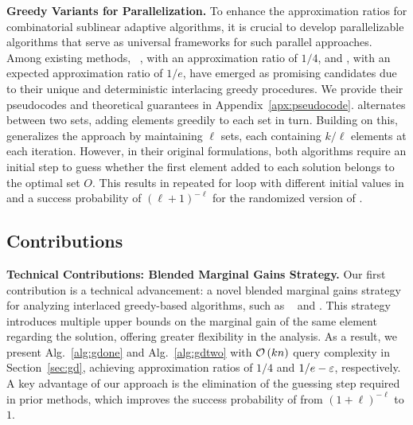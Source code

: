 \textbf{Greedy Variants for Parallelization.}
To enhance the approximation ratios for combinatorial sublinear adaptive algorithms, 
it is crucial to develop parallelizable algorithms that serve as universal frameworks for such parallel approaches. 
Among existing methods, \ig~\citep{DBLP:conf/nips/Kuhnle19}, 
with an approximation ratio of $1/4$, and \itg\citep{DBLP:conf/kdd/ChenK23},
with an expected approximation ratio of $1/e$, 
have emerged as promising candidates 
due to their unique and deterministic interlacing greedy procedures. 
We provide their pseudocodes and theoretical guarantees in Appendix~\ref{apx:pseudocode}. 
\ig alternates between two sets, adding elements greedily to each set in turn. 
Building on this, \itg generalizes the approach by maintaining $\ell$ sets, 
each containing $k/\ell$ elements at each iteration.
However, in their original formulations, both algorithms require an initial step to guess whether the first element added to each solution belongs to the optimal set $O$.
This results in repeated for loop with different initial values in \ig
and a success probability of 
$(\ell+1)^{-\ell}$
for the randomized version of \itg. 



\subsection{Contributions}
\textbf{Technical Contributions: Blended Marginal Gains Strategy.}
Our first contribution is a technical advancement: 
a novel blended marginal gains strategy for analyzing
interlaced greedy-based algorithms,
such as \ig~\citep{DBLP:conf/nips/Kuhnle19} and \itg\citep{DBLP:conf/kdd/ChenK23}.
This strategy introduces multiple upper bounds on the marginal gain 
of the same element regarding the solution, 
offering greater flexibility in the analysis.
As a result, we present Alg.~\ref{alg:gdone} and Alg.~\ref{alg:gdtwo} 
with $\mathcal O \left( kn \right)$ query complexity in Section~\ref{sec:gd},
achieving approximation ratios of $1/4$ and $1/e-\varepsilon$, respectively.
A key advantage of our approach is the elimination of the guessing step 
required in prior methods, which improves the success probability of \itg
from $(1+\ell)^{-\ell}$ to $1$.

